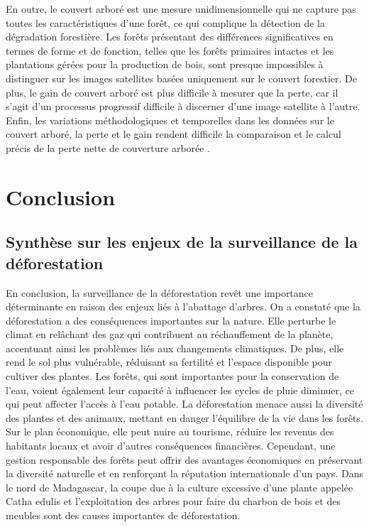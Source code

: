 En outre, le couvert arboré est une mesure unidimensionnelle qui ne capture pas toutes les caractéristiques d'une forêt, ce qui complique la détection de la dégradation forestière. Les forêts présentant des différences significatives en termes de forme et de fonction, telles que les forêts primaires intactes et les plantations gérées pour la production de bois, sont presque impossibles à distinguer sur les images satellites basées uniquement sur le couvert forestier. De plus, le gain de couvert arboré est plus difficile à mesurer que la perte, car il s'agit d'un processus progressif difficile à discerner d'une image satellite à l'autre. Enfin, les variations méthodologiques et temporelles dans les données sur le couvert arboré, la perte et le gain rendent difficile la comparaison et le calcul précis de la perte nette de couverture arborée \cite{56}.

\section{Conclusion}
\subsection{Synthèse sur les enjeux de la surveillance de la déforestation}
En conclusion, la surveillance de la déforestation revêt une importance déterminante en raison des enjeux liés à l'abattage d'arbres. On a constaté que la déforestation a des conséquences importantes sur la nature. Elle perturbe le climat en relâchant des gaz qui contribuent au réchauffement de la planète, accentuant ainsi les problèmes liés aux changements climatiques. De plus, elle rend le sol plus vulnérable, réduisant sa fertilité et l'espace disponible pour cultiver des plantes. Les forêts, qui sont importantes pour la conservation de l'eau, voient également leur capacité à influencer les cycles de pluie diminuer, ce qui peut affecter l'accès à l'eau potable. La déforestation menace aussi la diversité des plantes et des animaux, mettant en danger l'équilibre de la vie dans les forêts. 
Sur le plan économique, elle peut nuire au tourisme, réduire les revenus des habitants locaux et avoir d'autres conséquences financières. Cependant, une gestion responsable des forêts peut offrir des avantages économiques en préservant la diversité naturelle et en renforçant la réputation internationale d'un pays. Dans le nord de Madagascar, la coupe due à la culture excessive d'une plante appelée Catha edulis et l'exploitation des arbres pour faire du charbon de bois et des meubles sont des causes importantes de déforestation.
\\

